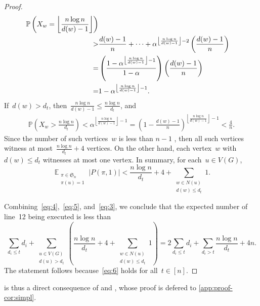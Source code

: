 \documentclass[a4paper,cleveref, autoref, 11pt, fleqn, thm-restate]{article}
\theoremstyle{plain}
\begin{document}
\begin{proof}
\begin{align}
    \mathbb{P}\left(X_{w}=\left\lfloor {\frac {n \log n}{d(w)-1}} \right\rfloor \right)
    \notag
    \\
    > & \frac{d(w)-1}{n} + \cdots + \alpha^{\left\lfloor {\frac {n \log n}{d(w)-1}} \right\rfloor - 2} \left(\frac{d(w)-1}{n}\right)
    \notag
    \\
    = & \left(\frac{1 - \alpha^{\left\lfloor {\frac {n \log n}{d(w)-1}} \right\rfloor - 1}}{1 - \alpha}\right) \left(\frac{d(w)-1}{n}\right)
    \notag
    \\
    = & {1 - \alpha^{\left\lfloor {\frac {n \log n}{d(w)-1}} \right\rfloor - 1}}.
    \notag
    \label{eq:2}
  \end{align}
  If~$d(w) > d_t$, then~$\frac {n\log n}{d(w)-1} \le \frac {n\log n}{d_t}$, and
  \begin{align}
    \mathbb{P}\left(X_{w}>\frac {n\log n}{d_t}\right)< \alpha^{\left\lfloor {\frac {n \log n}{d(w)-1}} \right\rfloor - 1} =  \left(1-\frac {d(w)-1}{n}\right)^{\left\lfloor {\frac {n \log n}{d(w)-1}} \right\rfloor - 1} < \frac{4}{n}.
  \end{align}
  Since the number of such vertices~$w$ is less than $n-1$ , then all such vertices witness at most~$\frac {n\log n}{d_t} + 4$ vertices.
  On the other hand, each vertex~$w$ with~$d(w)\le d_t$ witnesses at most one vertex.
  In summary, for each~$u\in V(G)$,
  \begin{equation}
    \label{eq:3}
    \mathop{\mathbb{E}}_{\substack{\pi \in {\mathfrak {S}_{n}}\\ \pi(u) = 1}} |P(\pi, 1)| <
    \frac {n\log n}{d_t} + 4 +
    \sum_{\substack{{w\in N(u)}\\ {d(w)\le d_t}}}1.
  \end{equation}

  Combining~\eqref{eq:4},~\eqref{eq:5}, and~\eqref{eq:3}, we conclude that the expected number of line~12 being executed is less than
  \begin{equation}
    \label{eq:6}
    \sum_{d_i\le t} d_i + \sum_{\substack{u \in V(G)\\ d(u) > d_{t}}} \left(\frac {n\log n}{d_t} + 4 +
    \sum_{\substack{{w\in N(u)}\\ {d(w)\le d_t}}}1\right)
    = 2\sum_{d_i\le t} d_i + \sum_{d_i>t} \frac {n\log n}{d_t} + 4n.
  \end{equation}
  The statement follows because~\eqref{eq:6} holds for all~$t\in [n]$.
\end{proof}


{ is thus a direct consequence of  and , whose proof is defered to \cref{app:proof-cor:simpl}.}
\end{document}
